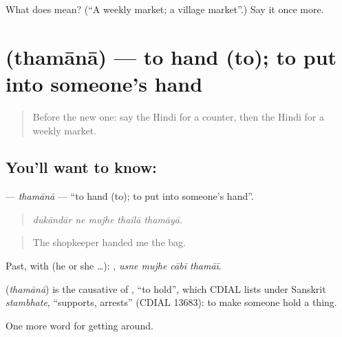 \begin{tcolorbox}[breakable,colback=teal!4,colframe=teal!35!black,title={Before you move on}]
What does  mean? (\textquotedblleft{}A weekly market; a village market\textquotedblright{}.) Say it once more.
\end{tcolorbox}
\section[\texorpdfstring{\hi{थमाना} (thamānā)}{थमाना (thamānā)}]{ (thamānā) — to hand (to); to put into someone's hand}

\label{lesson:HI-C433-thamana}



\begin{quote}
Before the new one: say the Hindi for a counter, then the Hindi for a weekly market.
\end{quote}

\subsection*{You'll want to know: }
\textbf{} — \emph{thamānā} — \textquotedblleft{}to hand (to); to put into someone's hand\textquotedblright{}.

\begin{quote}
    
\end{quote}

\begin{quote}
\emph{dukāndār ne mujhe thailā thamāyā.}
\end{quote}

\begin{quote}
The shopkeeper handed me the bag.
\end{quote}

Past, with  (he or she …):    , \emph{usne mujhe cābī thamāī}.

\begin{cousinweb}
\textbf{} (\emph{thamānā}) is the causative of , \textquotedblleft{}to hold\textquotedblright{}, which CDIAL lists under Sanskrit \emph{stambhate}, \textquotedblleft{}supports, arrests\textquotedblright{} (CDIAL 13683): to make someone hold a thing.
\end{cousinweb}

\begin{grammarlens}[title={What you've built}]
One more word for getting around.
\end{grammarlens}

